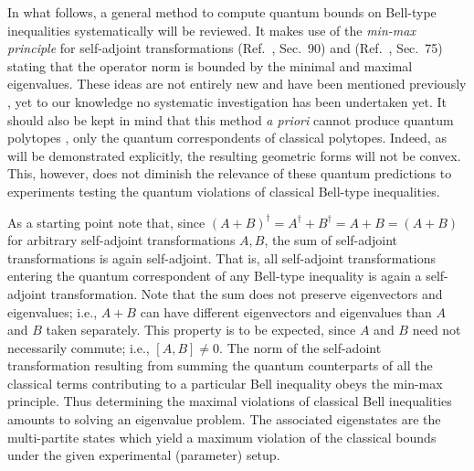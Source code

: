 \documentclass[pra,preprint,showpacs,showkeys,amsfonts]{revtex4}
\begin{document}
In what follows,
a general method to compute quantum bounds on Bell-type inequalities systematically will be reviewed.
It makes use of the {\em min-max principle} for self-adjoint transformations
(Ref.~\cite{halmos-vs}, Sec.~90) and (Ref.~\cite{reed-sim4}, Sec.~75)
stating that the operator norm is bounded by the minimal and maximal eigenvalues.
These ideas are not entirely new and have been mentioned previously
\cite{werner-wolf-2001,filipp-svo-04-qpoly,cabello-2003a},
yet to our knowledge no systematic investigation has been undertaken yet.
It should also be kept in mind that this method {\it a priori}
cannot produce quantum polytopes \cite{pit:range-2001,filipp-svo-04-qpoly},
only the quantum correspondents of classical polytopes.
Indeed, as will be demonstrated explicitly, the resulting geometric forms will not be convex.
This, however,
does not diminish the relevance of these quantum predictions
to experiments testing the quantum violations
of classical Bell-type inequalities.

As a starting point note that,
since $(A+B)^\dagger =A^\dagger +B^\dagger = A+B= (A+B)$ for arbitrary self-adjoint transformations $A,B$,
the sum of self-adjoint transformations is again self-adjoint.
That is, all self-adjoint transformations entering the quantum correspondent of any Bell-type inequality
is again a self-adjoint transformation.
Note that the sum does not preserve eigenvectors and eigenvalues;
i.e., $A+B$ can have different eigenvectors and eigenvalues than $A$ and $B$ taken separately.
This property is to be expected, since $A$ and $B$ need not necessarily commute;
i.e., $[A,B]\neq 0$.
The norm of the self-adoint transformation resulting from summing the quantum counterparts
of all the classical terms contributing to a particular Bell inequality obeys the min-max principle.
Thus determining the maximal violations of classical Bell inequalities amounts to
solving an eigenvalue problem.
The associated eigenstates are the multi-partite states which yield a maximum violation
of the classical bounds under the given experimental (parameter) setup.
\end{document}
